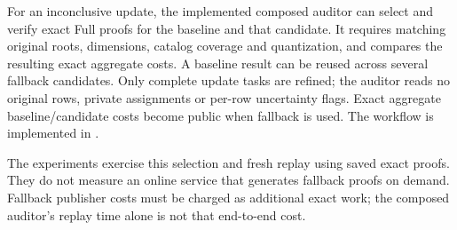 For an inconclusive update, the implemented composed auditor can select and
verify exact Full proofs for the baseline and that candidate. It requires
matching original roots, dimensions, catalog coverage and quantization, and
compares the resulting exact aggregate costs. A baseline result can be reused
across several fallback candidates. Only complete update tasks are refined;
the auditor reads no original rows, private assignments or per-row uncertainty
flags. Exact aggregate baseline/candidate costs become public when fallback is
used. The workflow is implemented in
.

The experiments exercise this selection and fresh replay using saved exact
proofs. They do not measure an online service that generates fallback proofs
on demand. Fallback publisher costs must be charged as additional exact work;
the composed auditor's replay time alone is not that end-to-end cost.
